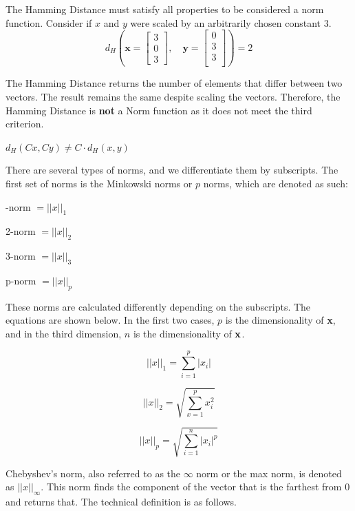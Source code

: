 The Hamming Distance must satisfy all properties to be considered a norm function. Consider if $x$ and $y$ were scaled by an arbitrarily chosen constant $3$.
\[
d_H \left( \mathbf{{x}} = 
\begin{bmatrix}
    3 \\
    0 \\
    3 
\end{bmatrix}, 
\quad
\mathbf{{y}} = 
\begin{bmatrix}
    0 \\
    3 \\
    3 \\
\end{bmatrix} \right) = 2
\]

The Hamming Distance returns the number of elements that differ between two vectors. The result remains the same despite scaling the vectors. 
Therefore, the Hamming Distance is \textbf{not} a Norm function as it does not meet the third criterion.

\centering
$d_{H}(Cx,Cy) \ne C \cdot d_{H}(x,y)$

\raggedright

There are several types of norms, and we differentiate them by subscripts. The first set of norms is the Minkowski norms or $p$ norms, which are denoted as such:

-norm $= ||x||_1$

2-norm $= ||x||_2$

3-norm $= ||x||_3$

p-norm $= ||x||_p$

\raggedright

These norms are calculated differently depending on the subscripts. The equations are shown below. In the first two cases, $p$ is the dimensionality of {\bf x}, 
and in the third dimension, $n$ is the dimensionality of ${\bf x}$.

\centering
$$||x||_1 = \sum_{i=1}^{p}|x_i|$$

$$||x||_2 = \sqrt{\sum_{x=1}^{p}x_i^2}$$

$$||x||_p = \sqrt{\sum_{i=1}^{n}|x_i|^p}$$

\raggedright

Chebyshev's norm, also referred to as the $\infty$ norm or the max norm, is denoted as $||x||_\infty$. This norm finds the component of the vector that is the 
farthest from 0 and returns that. The technical definition is as follows.

